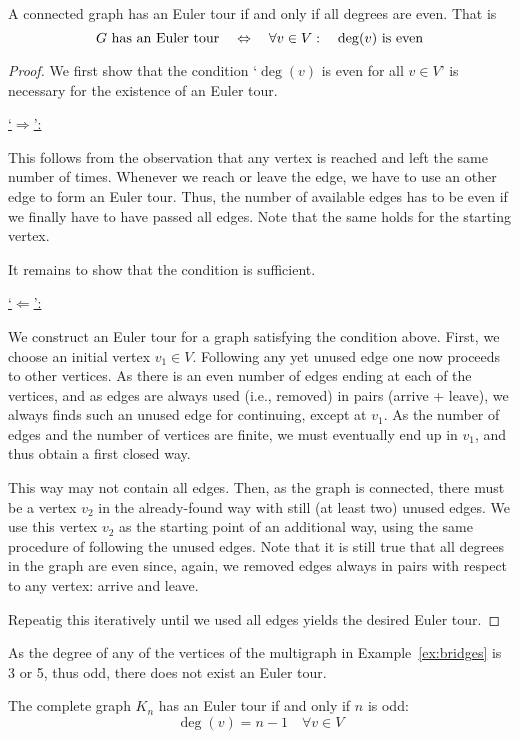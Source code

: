 \begin{theorem}[Euler]\label{thm:euler}
A connected graph has an Euler tour if and only if all degrees are even. That is
\[
\text{$G$ has an Euler tour} \quad \Leftrightarrow \quad \forall v \in V: \quad \text{$\deg(v)$ is even} \qedhere
\]
\end{theorem}
\begin{proof}
We first show that the condition
`$\deg(v)$ is even for all $v \in V$'
is necessary for the existence of an Euler tour.

\underline{`$\Longrightarrow$':}

This follows from the observation that any vertex is reached and left the same number of times. Whenever we reach or leave the edge, we have to use an other edge to form an Euler tour. Thus, the number of available edges has to be even if we finally have to have passed all edges. Note that the same holds for the starting vertex.

It remains to show that the condition is sufficient.

\underline{`$\Longleftarrow$':}

We construct an Euler tour for a graph satisfying the condition above. 
First, we choose an initial vertex $v_1 \in V$. 
Following any yet unused edge one now proceeds to other vertices. 
As there is an even number of edges ending at each of the vertices, and as edges are always used (i.e., removed) in pairs (arrive + leave), we always finds such an unused edge for continuing, except at $v_1$. 
As the number of edges and the number of vertices are finite, we must eventually end up in $v_1$, and thus obtain a first closed way.

This way may not contain all edges. 
Then, as the graph is connected, there must be a vertex $v_2$ in the already-found way with still (at least two) unused edges. 
We use this vertex $v_2$ as the starting point of an additional way, using the same procedure of following the unused edges.
Note that it is still true that all degrees in the graph are even since, again, we removed edges always in pairs with respect to any vertex: arrive and leave.

Repeatig this iteratively until we used all edges yields the desired Euler tour.
\end{proof}

As the degree of any of the vertices of the multigraph in Example~\ref{ex:bridges} is 3 or 5, thus odd, there does not exist an Euler tour.

The complete graph \(K_n\) has an Euler tour if and only if \(n\) is odd:
\[
\deg(v) = n-1 \quad \forall v\in V
\]

